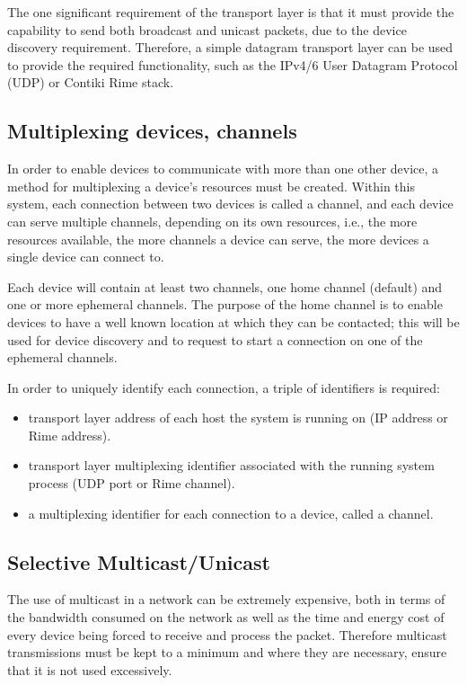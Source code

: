 The one significant requirement of the transport layer is that it must provide the capability to send both broadcast and unicast packets, due to the device discovery requirement.
Therefore, a simple datagram transport layer can be used to provide the required functionality, such as the IPv4/6 User Datagram Protocol (UDP) or Contiki Rime stack\cite{RimeStack}.

\subsection{Multiplexing devices, channels}
In order to enable devices to communicate with more than one other device, a method for multiplexing a device's resources must be created. Within this system, each connection between two devices is called a channel, and each device can serve multiple channels, depending on its own resources, i.e., the more resources available, the more channels a device can serve, the more devices a single device can connect to. 

Each device will contain at least two channels, one home channel (default) and one or more ephemeral channels. The purpose of the home channel is to enable devices to have a well known location at which they can be contacted; this will be used for device discovery and to request to start a connection on one of the ephemeral channels.

In order to uniquely identify each connection, a triple of identifiers is required:\vspace{-5mm} 
\begin{itemize}
	\item transport layer address of each host the system is running on (IP address or Rime address).
	\item transport layer multiplexing identifier associated with the running system process (UDP port or Rime channel).
	\item a multiplexing identifier for each connection to a device, called a channel.
\end{itemize}

\subsection{Selective Multicast/Unicast} %
\label{sub:selective_multicast_unicast}
The use of multicast in a network can be extremely expensive, both in terms of the bandwidth consumed on the network as well as the time and energy cost of every device being forced to receive and process the packet. Therefore multicast transmissions must be kept to a minimum and where they are necessary, ensure that it is not used excessively.

